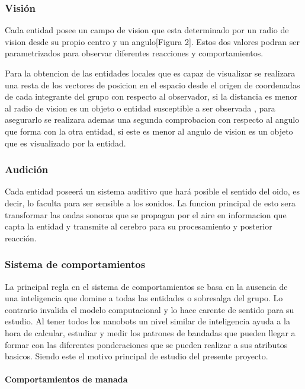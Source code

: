 \subsubsection{Visión}
\label{sec:vision}

Cada entidad posee un campo de vision que esta determinado por un radio de vision desde su propio centro y un angulo[Figura 2]. Estos dos valores podran ser parametrizados para observar diferentes reacciones y comportamientos. 

Para la obtencion de las entidades locales que es capaz de visualizar se realizara una resta de los vectores de posicion en el espacio desde el origen de coordenadas de cada integrante del grupo con respecto al observador, si la distancia es menor al radio de vision es un objeto o entidad susceptible a ser observada , para asegurarlo se realizara ademas una segunda comprobacion con respecto al angulo que forma con la otra entidad, si este  es menor al angulo de vision es un objeto que es visualizado por la entidad.


\subsubsection{Audición}
\label{sec:audicion}

Cada entidad poseerá un sistema auditivo que hará posible el sentido del oido, es decir, lo faculta para ser sensible a los sonidos. La funcion principal de esto sera transformar las ondas sonoras que se propagan por el aire en informacion que capta la entidad y transmite al cerebro para su procesamiento y posterior reacción.


\subsubsection{Sistema de comportamientos}
\label{sec:sistema_comportamientos}

La principal regla en el sistema de comportamientos se basa en la ausencia de una inteligencia que domine a todas las entidades o sobresalga del grupo. Lo contrario invalida el modelo computacional y lo hace carente de sentido para su estudio. Al tener todos los nanobots un nivel similar de inteligencia ayuda a la hora de calcular, estudiar y medir los patrones de bandadas que pueden llegar a formar con las diferentes  ponderaciones que se pueden realizar a sus atributos basicos. Siendo este el motivo principal de estudio del presente proyecto.

\paragraph{Comportamientos de manada}


